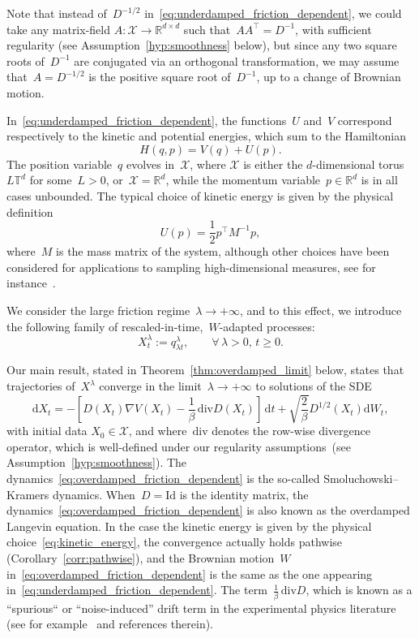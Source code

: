 \documentclass[10pt]{article}
\renewcommand{\d}{\mathrm{d}}
\newcommand{\R}{\mathbb{R}}
\newcommand{\cX}{\mathcal{X}}
\newcommand{\1}{\mathbbm 1}
\newcommand{\Id}{\mathrm{Id}}
\begin{document}
Note that instead of~$D^{-1/2}$ in~\eqref{eq:underdamped_friction_dependent}, we could take any matrix-field $A:\cX\to\R^{d\times d}$ such that~$AA^\top=D^{-1}$, with sufficient regularity (see Assumption~\ref{hyp:smoothness} below),
but since any two square roots of~$D^{-1}$ are conjugated via an orthogonal transformation, we may assume that~$A=D^{-1/2}$ is the positive square root of~$D^{-1}$, up to a change of Brownian motion.

In~\eqref{eq:underdamped_friction_dependent}, the functions~$U$ and~$V$ correspond respectively to the kinetic and potential energies, which sum to the Hamiltonian
\begin{equation}
    \label{eq:hamiltonian}
    H(q,p) = V(q)+U(p).
\end{equation}
The position variable~$q$ evolves in~$\mathcal X$, where $\cX$ is either the $d$-dimensional torus~$L\mathbb T^d$ for some~$L>0$, or~$\cX=\R^d$, while the momentum variable~$p\in\R^d$ is in all cases unbounded. The typical choice of kinetic energy is given by the physical definition
\begin{equation}
    \label{eq:kinetic_energy}
    U(p)=\frac12 p^\top M^{-1}p,
\end{equation}
where~$M$ is the mass matrix of the system, although other choices have been considered for applications to sampling high-dimensional measures, see for instance~\cite{ST18}.

We consider the large friction regime~$\lambda\to+\infty$, and to this effect, we introduce the following family of rescaled-in-time,~$W$-adapted processes:
\begin{equation}
    \label{eq:underdamped_time_rescaled}
    X_t^\lambda := q_{\lambda t}^\lambda,\qquad\forall\,\lambda>0,\,t\geq 0.
\end{equation}

Our main result, stated in Theorem~\ref{thm:overdamped_limit} below, states that trajectories of~$X^\lambda$ converge in the limit~$\lambda\to +\infty$ to solutions of the SDE
\begin{equation}
    \label{eq:overdamped_friction_dependent}
    \d X_t = -\left[D(X_t)\nabla V(X_t) - \frac1\beta\,\mathrm{div} D(X_t)\right]\,\d t + \sqrt{\frac{2}{\beta}}D^{1/2}(X_t)\d W_t,
\end{equation}
with initial data $X_0\in\cX$, and where~$\mathrm{div}$ denotes the row-wise divergence operator, which is well-defined under our regularity assumptions~(see Assumption~\ref{hyp:smoothness}). The dynamics~\eqref{eq:overdamped_friction_dependent} is the so-called Smoluchowski--Kramers dynamics. When~$D=\Id$ is the identity matrix, the dynamics~\eqref{eq:overdamped_friction_dependent} is also known as the overdamped Langevin equation.
In the case the kinetic energy is given by the physical choice~\eqref{eq:kinetic_energy}, the convergence actually holds pathwise (Corollary~\ref{corr:pathwise}), and the Brownian motion~$W$ in~\eqref{eq:overdamped_friction_dependent} is the same as the one appearing in~\eqref{eq:underdamped_friction_dependent}.
The term~$\frac1\beta\,\mathrm{div} D$, which is known as a ``spurious`` or ``noise-induced'' drift term in the experimental physics literature (see for example~\cite{VHBWB10,BVHWB11} and references therein).
\end{document}
